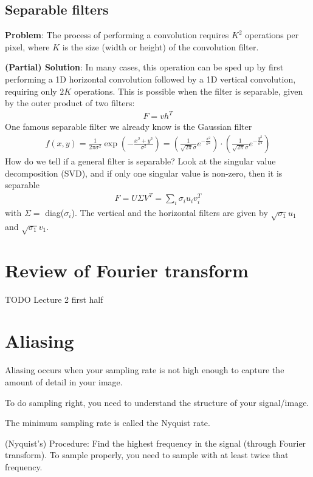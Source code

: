\documentclass[11pt]{article}
\begin{document}
\subsection{Separable filters}
\textbf{Problem}: The process of performing a convolution requires $K^2$ operations per pixel, where $K$ is the size (width or height) of the convolution filter. 

\textbf{(Partial) Solution}: In many cases, this operation can be sped up by first performing a 1D horizontal convolution followed by a 1D vertical convolution, requiring only $2K$ operations. This is possible when the filter is separable, given by the outer product of two filters: 
\begin{align*}
    F = v h^T
\end{align*}
One famous separable filter we already know is the Gaussian filter
\begin{align*}
    f(x,y) = \frac{1}{2\pi\sigma^2} \exp\left( - \frac{x^2 + y^2}{\sigma^2} \right) = \left( \frac{1}{\sqrt{2\pi}\sigma} e^{-\frac{x^2}{\sigma^2}} \right) \cdot \left( \frac{1}{\sqrt{2\pi}\sigma} e^{-\frac{y^2}{\sigma^2}} \right)
\end{align*}
How do we tell if a general filter is separable? Look at the singular value decomposition (SVD), and if only one singular value is non-zero, then it is separable
\begin{align*}
    F = U \Sigma V^T = \sum_i \sigma_i u_i v_i^T 
\end{align*}
with $\Sigma =$ diag($\sigma_i$). The vertical and the horizontal filters are given by $\sqrt{\sigma_1} u_1$ and $\sqrt{\sigma_1} v_1$. 

\section{Review of Fourier transform}
TODO Lecture 2 first half

\section{Aliasing}
Aliasing occurs when your sampling rate is not high enough to capture the amount of detail in your image. 

To do sampling right, you need to understand the structure of your signal/image. 

The minimum sampling rate is called the Nyquist rate. 

(Nyquist's) Procedure: Find the highest frequency in the signal (through Fourier transform). To sample properly, you need to sample with at least twice that frequency. 
\end{document}
